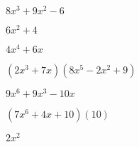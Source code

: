 \documentclass{article}
\begin{document}
\begin{multicols}{2}
\item $8x^{3}+9x^2-6$\item $6x^2+4$\item $4x^{4}+6x$\item $(2x^{3}+7x)(8x^{5}-2x^2+9)$\item $9x^{6}+9x^{3}-10x$\item $(7x^{6}+4x+10)(10)$\item $2x^2$\item 
\end{multicols}
\end{document}

